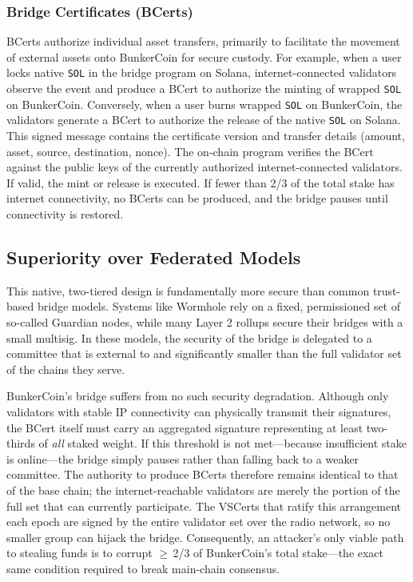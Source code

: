 \documentclass{article}
\begin{document}
\subsubsection{Bridge Certificates (BCerts)}
BCerts authorize individual asset transfers, primarily to facilitate the movement of external assets onto BunkerCoin for secure custody. For example, when a user locks native \texttt{SOL} in the bridge program on Solana, internet-connected validators observe the event and produce a BCert to authorize the minting of wrapped \texttt{SOL} on BunkerCoin. Conversely, when a user burns wrapped \texttt{SOL} on BunkerCoin, the validators generate a BCert to authorize the release of the native \texttt{SOL} on Solana. This signed message contains the certificate version and transfer details (amount, asset, source, destination, nonce). The on-chain program verifies the BCert against the public keys of the currently authorized internet-connected validators. If valid, the mint or release is executed. If fewer than 2/3 of the total stake has internet connectivity, no BCerts can be produced, and the bridge pauses until connectivity is restored.

\subsection{Superiority over Federated Models}
This native, two-tiered design is fundamentally more secure than common trust-based bridge models. Systems like Wormhole rely on a fixed, permissioned set of so-called Guardian nodes, while many Layer 2 rollups secure their bridges with a small multisig. In these models, the security of the bridge is delegated to a committee that is external to and significantly smaller than the full validator set of the chains they serve.

BunkerCoin's bridge suffers from no such security degradation. Although only validators with stable IP connectivity can physically transmit their signatures, the BCert itself must carry an aggregated signature representing at least two-thirds of \emph{all} staked weight.  If this threshold is not met—because insufficient stake is online—the bridge simply pauses rather than falling back to a weaker committee.  The authority to produce BCerts therefore remains identical to that of the base chain; the internet-reachable validators are merely the portion of the full set that can currently participate.  The VSCerts that ratify this arrangement each epoch are signed by the 
entire validator set over the radio network, so no smaller group can hijack the bridge.  Consequently, an attacker’s only viable path to stealing funds is to corrupt $\geq$\,2/3 of BunkerCoin’s total stake—the exact same condition required to break main-chain consensus.
\end{document}
